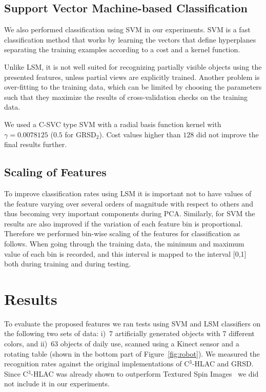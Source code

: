 \documentclass[letterpaper, 10 pt, conference]{sty/ieeeconf}
\begin{document}
\subsection{Support Vector Machine-based Classification}
We also performed classification using SVM in our experiments.
SVM is a fast classification method that works by learning the vectors that define hyperplanes separating
the training examples according to a cost and a kernel function.

Unlike LSM, it is not well suited for recognizing partially visible objects using the presented features,
unless partial views are explicitly trained. Another problem is over-fitting to the training data, which
can be limited by choosing the parameters such that they maximize the results of cross-validation checks
on the training data.

We used a C-SVC type SVM with a radial basis function kernel \cite{LIBSVM} with $\gamma = 0.0078125$
($0.5$ for GRSD$_2$). Cost values higher than $128$ did not improve the final results further.

\subsection{Scaling of Features}
To improve classification rates using LSM it is important not to have values of the feature 
varying over several orders of magnitude with respect to others and thus becoming very important components
during PCA. Similarly, for SVM the results are also improved if the variation of each feature bin is
proportional. Therefore we performed bin-wise scaling of the features for classification as follows.
When going through the training data, the minimum and maximum value of each bin is recorded, and this interval 
is mapped to the interval [0,1] both during training and during testing.


\section{Results}
\label{sec:results}
To evaluate the proposed features we ran
tests using SVM and LSM classifiers on the following two sets of data: 
i)~7 artificially generated objects with 7 different colors, and
ii)~63 objects of daily use, scanned using a Kinect sensor and a rotating table
(shown in the bottom part of Figure~\ref{fig:robot}). 
We measured the recognition rates against the original implementations of C$^3$-HLAC and 
GRSD. 
Since C$^3$-HLAC was already shown to outperform Textured Spin Images~\cite{cortelazzo2006}
we did not include it in our experiments.
\end{document}
